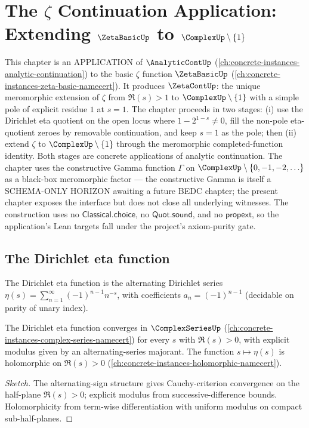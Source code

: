\chapter{The \(\zeta\) Continuation Application: Extending \(\ZetaBasicUp\) to \(\ComplexUp \setminus \{1\}\)}
\label{ch:concrete-instances-zeta-continuation}

This chapter is an APPLICATION of \(\AnalyticContUp\) (\autoref{ch:concrete-instances-analytic-continuation}) to the basic \(\zeta\) function \(\ZetaBasicUp\) (\autoref{ch:concrete-instances-zeta-basic-namecert}). It produces \(\ZetaContUp\): the unique meromorphic extension of \(\zeta\) from \(\Re(s) > 1\) to \(\ComplexUp \setminus \{1\}\) with a simple pole of explicit residue \(1\) at \(s = 1\). The chapter proceeds in two stages: (i) use the Dirichlet eta quotient on the open locus where \(1-2^{1-s}\neq 0\), fill the non-pole eta-quotient zeroes by removable continuation, and keep \(s=1\) as the pole; then (ii) extend \(\zeta\) to \(\ComplexUp \setminus \{1\}\) through the meromorphic completed-function identity. Both stages are concrete applications of analytic continuation. The chapter uses the constructive Gamma function \(\Gamma\) on \(\ComplexUp \setminus \{0, -1, -2, \ldots\}\) as a black-box meromorphic factor --- the constructive Gamma is itself a SCHEMA-ONLY HORIZON awaiting a future BEDC chapter; the present chapter exposes the interface but does not close all underlying witnesses. The construction uses no \(\mathsf{Classical.choice}\), no \(\mathsf{Quot.sound}\), and no \(\mathsf{propext}\), so the application's Lean targets fall under the project's axiom-purity gate.

\section{The Dirichlet eta function}

\begin{definition}
\label{def:dirichlet-eta}
The Dirichlet eta function is the alternating Dirichlet series \(\eta(s) = \sum_{n=1}^{\infty} (-1)^{n-1} n^{-s}\), with coefficients \(a_n = (-1)^{n-1}\) (decidable on parity of unary index).
\end{definition}

\begin{theorem}
\label{thm:eta-well-defined}
The Dirichlet eta function converges in \(\ComplexSeriesUp\) (\autoref{ch:concrete-instances-complex-series-namecert}) for every \(s\) with \(\Re(s) > 0\), with explicit modulus given by an alternating-series majorant. The function \(s \mapsto \eta(s)\) is holomorphic on \(\Re(s) > 0\) (\autoref{ch:concrete-instances-holomorphic-namecert}).
\end{theorem}
\begin{proof}[Sketch]
The alternating-sign structure gives Cauchy-criterion convergence on the half-plane \(\Re(s) > 0\); explicit modulus from successive-difference bounds. Holomorphicity from term-wise differentiation with uniform modulus on compact sub-half-planes.
\end{proof}

